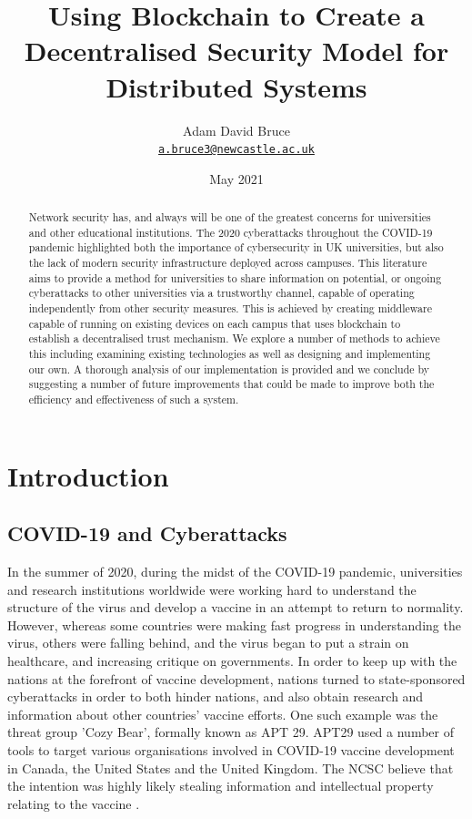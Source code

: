 \documentclass[a4paper, 11pt]{report}
\title{\Huge{\textbf{Using Blockchain to Create a Decentralised Security Model for Distributed Systems}}}
\date{May 2021}
\author{
\Large{Adam David Bruce} \\ \texttt{\href{mailto:a.bruce3@newcastle.ac.uk}{a.bruce3@newcastle.ac.uk}}}
\begin{document}
\maketitle

\begin{abstract}
Network security has, and always will be one of the greatest concerns for universities and other educational institutions. The 2020 cyberattacks throughout the COVID-19 pandemic highlighted both the importance of cybersecurity in UK universities, but also the lack of modern security infrastructure deployed across campuses. This literature aims to provide a method for universities to share information on potential, or ongoing cyberattacks to other universities via a trustworthy channel, capable of operating independently from other security measures. This is achieved by creating \gls{middleware} capable of running on existing devices on each campus that uses \gls{blockchain} to establish a decentralised trust mechanism. We explore a number of methods to achieve this including examining existing technologies as well as designing and implementing our own. A thorough analysis of our implementation is provided and we conclude by suggesting a number of future improvements that could be made to improve both the efficiency and effectiveness of such a system.
\end{abstract}

\tableofcontents
\listoffigures
\listoftables

\newpage

\chapter{Introduction}
\section{COVID-19 and Cyberattacks}
In the summer of 2020, during the midst of the COVID-19 pandemic, universities and research institutions worldwide were working hard to understand the structure of the virus and develop a vaccine in an attempt to return to normality. However, whereas some countries were making fast progress in understanding the virus, others were falling behind, and the virus began to put a strain on healthcare, and increasing critique on governments. In order to keep up with the nations at the forefront of vaccine development, nations turned to state-sponsored cyberattacks in order to both hinder nations, and also obtain research and information about other countries' vaccine efforts. One such example was the threat group 'Cozy Bear', formally known as \acrfull{APT} 29. \acrshort{APT}29 used a number of tools to target various organisations involved in COVID-19 vaccine development in Canada, the United States and the United Kingdom. The \acrfull{NCSC} believe that the intention was highly likely stealing information and intellectual property relating to the vaccine \cite{APT29}.
\end{document}
